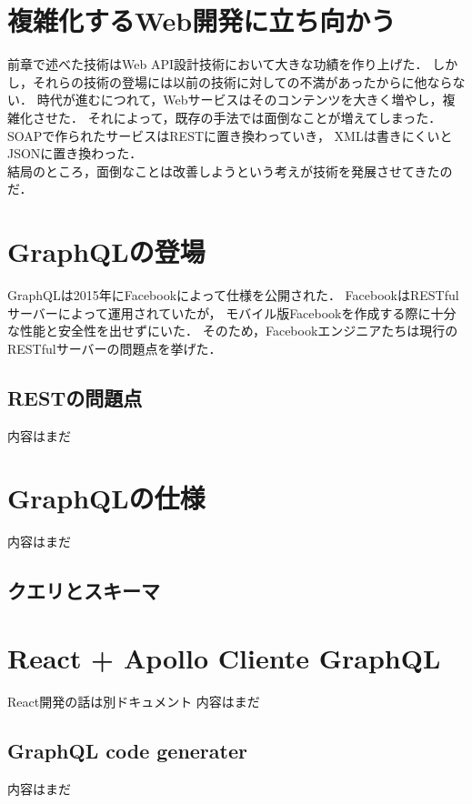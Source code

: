 \documentclass[11pt,a4paper]{jsarticle}
\begin{document}
\section{複雑化するWeb開発に立ち向かう}
前章で述べた技術はWeb API設計技術において大きな功績を作り上げた．
しかし，それらの技術の登場には以前の技術に対しての不満があったからに他ならない．
時代が進むにつれて，Webサービスはそのコンテンツを大きく増やし，複雑化させた．
それによって，既存の手法では面倒なことが増えてしまった．
SOAPで作られたサービスはRESTに置き換わっていき，
XMLは書きにくいとJSONに置き換わった．\\
結局のところ，面倒なことは改善しようという考えが技術を発展させてきたのだ．

\section{GraphQLの登場}
GraphQLは2015年にFacebookによって仕様を公開された．
FacebookはRESTfulサーバーによって運用されていたが，
モバイル版Facebookを作成する際に十分な性能と安全性を出せずにいた．
そのため，Facebookエンジニアたちは現行のRESTfulサーバーの問題点を挙げた．
\subsection{RESTの問題点}
内容はまだ


\section{GraphQLの仕様}
内容はまだ
\subsection{クエリとスキーマ}

\section{React + Apollo Cliente GraphQL}
React開発の話は別ドキュメント
内容はまだ

\subsection{GraphQL code generater}
内容はまだ
\end{document}
